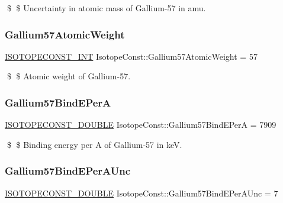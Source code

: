 \$ \$ Uncertainty in atomic mass of Gallium-\/57 in amu. \mbox{\label{group___isotope_const-_gallium-_ga57_ga40662e813bf0354264ffc79477d297a7}} 
\subsubsection{\texorpdfstring{Gallium57\+Atomic\+Weight}{Gallium57AtomicWeight}}
{\footnotesize\ttfamily \mbox{\hyperlink{group___isotope_const-_macros_ga5f18360b3e99483a35c32d789e62621c}{I\+S\+O\+T\+O\+P\+E\+C\+O\+N\+S\+T\+\_\+\+I\+NT}} Isotope\+Const\+::\+Gallium57\+Atomic\+Weight = 57}

\$ \$ Atomic weight of Gallium-\/57. \mbox{\label{group___isotope_const-_gallium-_ga57_ga945c981034cba5870da3e0e97669a06c}} 
\subsubsection{\texorpdfstring{Gallium57\+Bind\+E\+PerA}{Gallium57BindEPerA}}
{\footnotesize\ttfamily \mbox{\hyperlink{group___isotope_const-_macros_ga8f45a7272ce02c0b4c65c44636ed719a}{I\+S\+O\+T\+O\+P\+E\+C\+O\+N\+S\+T\+\_\+\+D\+O\+U\+B\+LE}} Isotope\+Const\+::\+Gallium57\+Bind\+E\+PerA = 7909}

\$ \$ Binding energy per A of Gallium-\/57 in keV. \mbox{\label{group___isotope_const-_gallium-_ga57_ga5007628c013b48070fe3c6569109b7b7}} 
\subsubsection{\texorpdfstring{Gallium57\+Bind\+E\+Per\+A\+Unc}{Gallium57BindEPerAUnc}}
{\footnotesize\ttfamily \mbox{\hyperlink{group___isotope_const-_macros_ga8f45a7272ce02c0b4c65c44636ed719a}{I\+S\+O\+T\+O\+P\+E\+C\+O\+N\+S\+T\+\_\+\+D\+O\+U\+B\+LE}} Isotope\+Const\+::\+Gallium57\+Bind\+E\+Per\+A\+Unc = 7}


